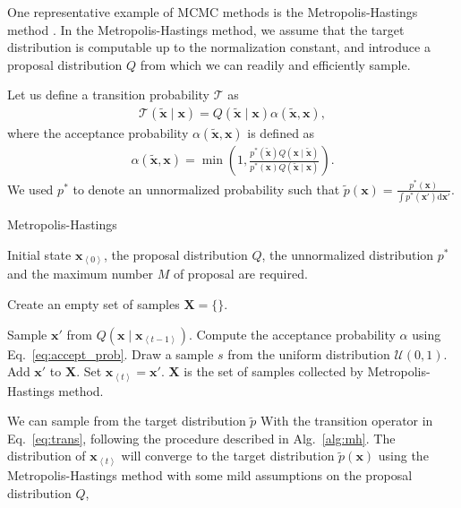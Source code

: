\documentclass{now}
\newcommand{\qt}[1]{\left<#1\right>}
\newcommand{\vect}[1]{\mathbf{#1}}
\newcommand{\vx}[0]{\vect{x}}
\newcommand{\T}[0]{\mathcal{T}}
\newcommand{\dd}[1]{\text{d}{#1}}
\begin{document}
One representative example of MCMC methods is
the Metropolis-Hastings method \citep{Hastings1970}. In the
Metropolis-Hastings method, we assume that the target
distribution is computable up to the normalization constant,
and introduce a proposal distribution $Q$ from which we can
readily and efficiently sample.

Let us define a transition probability $\T$ as
\begin{align}
    \label{eq:trans}
    \T(\tilde{\vx} \mid \vx) = Q(\tilde{\vx}\mid \vx)
    \alpha(\tilde{\vx}, \vx),
\end{align}
where the acceptance probability $\alpha(\tilde{\vx}, \vx)$ is
defined as
\begin{align}
    \label{eq:accept_prob}
    \alpha(\tilde{\vx}, \vx) = \min \left(1, 
    \frac{p^*(\tilde{\vx})Q(\vx \mid \tilde{\vx})}
    {p^*(\vx)Q(\tilde{\vx} \mid \vx)} \right).
\end{align}
We used $p^*$ to denote an unnormalized probability
such that
$\tilde{p}(\vx) = \tfrac{p^*(\vx)}{\int p^*(\vx') \dd{\vx'}}$.

\begin{algorithm}[tb]
    \caption[Metropolis-Hastings
    Method]{Metropolis-Hastings}
    \label{alg:mh}
    \begin{algorithmic}
        \STATE Initial state $\vx_{\qt{0}}$, the proposal
        distribution $Q$, the unnormalized distribution
        $p^*$ and the maximum number $M$ of proposal are required.

        \STATE Create an empty set of samples $\boldsymbol{X}=\{\}$.

        \STATE Sample $\vx'$ from $Q(\vx \mid
        \vx_{\qt{t-1}})$.
        \STATE Compute the acceptance probability
        $\alpha$ using Eq.~\eqref{eq:accept_prob}.
        \STATE Draw a sample $s$ from the uniform distribution
        $\mathcal{U}(0, 1)$.
        \STATE Add $\vx'$ to $\boldsymbol{X}$.
        \STATE Set $\vx_{\qt{t}} = \vx'$.
        \ENDIF
        \ENDFOR
        \STATE
        $\boldsymbol{X}$ is the set of samples collected by
        Metropolis-Hastings method.
    \end{algorithmic}
\end{algorithm}

We can sample from the target
distribution $\tilde{p}$ With the transition operator in Eq.~\eqref{eq:trans}, 
following the procedure described in Alg.~\ref{alg:mh}.
The distribution of $\vx_{\qt{t}}$ will converge to the target
distribution $\tilde{p}(\vx)$ using the Metropolis-Hastings
method
with some mild assumptions on the proposal distribution $Q$,
\end{document}
